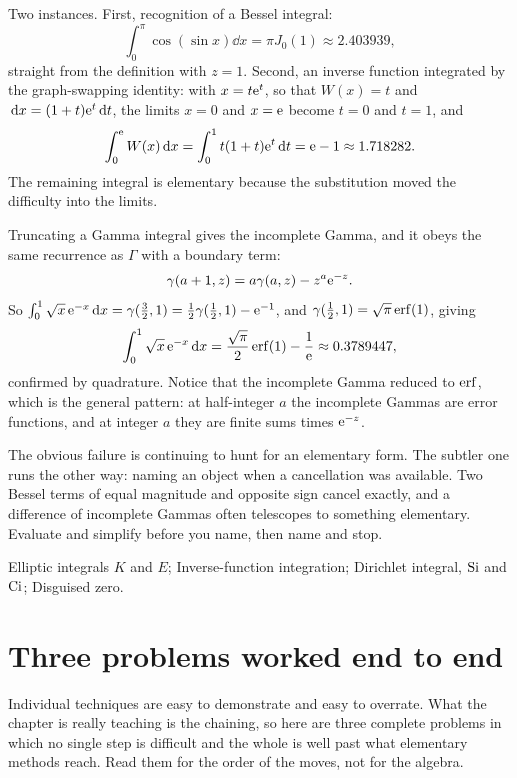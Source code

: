 \begin{worked}
Two instances. First, recognition of a Bessel integral:
\[\int_0^{\pi}\cos(\sin x)\dd x=\pi J_0(1)\approx2.403939,\]
straight from the definition with $z=1$. Second, an inverse function integrated by the graph-swapping identity: with $x=t\mathrm{e}^{t}$, so that $W(x)=t$ and $\,\mathrm{d} x=(1+t)\mathrm{e}^{t}\,\mathrm{d} t$, the limits $x=0$ and $x=\mathrm{e}$ become $t=0$ and $t=1$, and
\[\int_0^{\mathrm{e}}W(x)\,\mathrm{d} x=\int_0^1t(1+t)\mathrm{e}^{t}\,\mathrm{d} t=\mathrm{e}-1\approx1.718282.\]
The remaining integral is elementary because the substitution moved the difficulty into the limits.
\end{worked}

\begin{worked}
Truncating a Gamma integral gives the incomplete Gamma, and it obeys the same recurrence as $\Gamma$ with a boundary term:
\[\gamma(a+1,z)=a\gamma(a,z)-z^{a}\mathrm{e}^{-z}.\]
So $\int_0^1\sqrt x\,\mathrm{e}^{-x}\,\mathrm{d} x=\gamma(\tfrac32,1)=\tfrac12\gamma(\tfrac12,1)-\mathrm{e}^{-1}$, and $\gamma(\tfrac12,1)=\sqrt\pi\operatorname{erf}(1)$, giving
\[\int_0^1\sqrt x\,\mathrm{e}^{-x}\,\mathrm{d} x=\frac{\sqrt\pi}{2}\operatorname{erf}(1)-\frac1{\mathrm{e}}\approx0.3789447,\]
confirmed by quadrature. Notice that the incomplete Gamma reduced to $\operatorname{erf}$, which is the general pattern: at half-integer $a$ the incomplete Gammas are error functions, and at integer $a$ they are finite sums times $\mathrm{e}^{-z}$.
\end{worked}

\begin{trap}
The obvious failure is continuing to hunt for an elementary form. The subtler one runs the other way: naming an object when a cancellation was available. Two Bessel terms of equal magnitude and opposite sign cancel exactly, and a difference of incomplete Gammas often telescopes to something elementary. Evaluate and simplify before you name, then name and stop.
\end{trap}

\begin{seealsob}Elliptic integrals $K$ and $E$; Inverse-function integration; Dirichlet integral, $\operatorname{Si}$ and $\operatorname{Ci}$; Disguised zero.\end{seealsob}

\section{Three problems worked end to end}

Individual techniques are easy to demonstrate and easy to overrate. What the chapter is really teaching is the chaining, so here are three complete problems in which no single step is difficult and the whole is well past what elementary methods reach. Read them for the order of the moves, not for the algebra.

